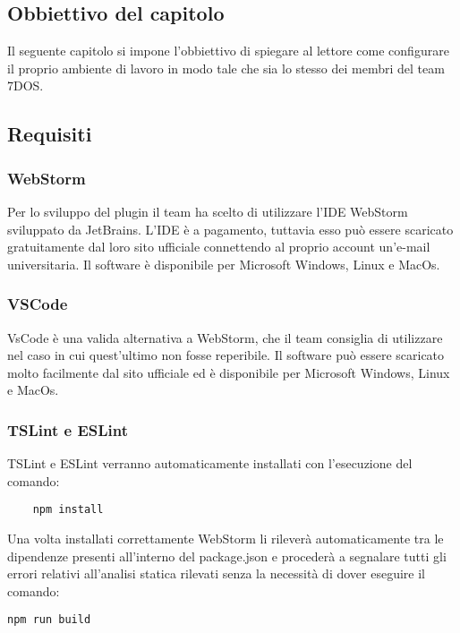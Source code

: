 \subsection{Obbiettivo del capitolo}
Il seguente capitolo si impone l'obbiettivo di spiegare al lettore come configurare il proprio ambiente di lavoro in modo tale che sia lo stesso dei membri del team 7DOS.  
\subsection{Requisiti}

\subsubsection{WebStorm}
Per lo sviluppo del plugin il team ha scelto di utilizzare l'IDE WebStorm sviluppato da JetBrains. L'IDE è a pagamento, tuttavia esso può essere scaricato gratuitamente dal loro sito ufficiale connettendo al proprio account un'e-mail universitaria.
Il software è disponibile per Microsoft Windows, Linux e MacOs.
\subsubsection{VSCode}
VsCode è una valida alternativa a WebStorm, che il team consiglia di utilizzare nel caso in cui quest'ultimo non fosse reperibile.
Il software può essere scaricato molto facilmente dal sito ufficiale ed è disponibile per Microsoft Windows, Linux e MacOs.
\subsubsection{TSLint e ESLint}
TSLint e ESLint verranno automaticamente installati con l'esecuzione del comando:
\begin{verbatim}
	npm install
\end{verbatim}
Una volta installati correttamente WebStorm li rileverà automaticamente tra le dipendenze presenti all'interno del package.json e procederà a segnalare tutti gli errori relativi all'analisi statica rilevati senza  la necessità di dover eseguire il comando:
\begin{verbatim}
npm run build
\end{verbatim}

